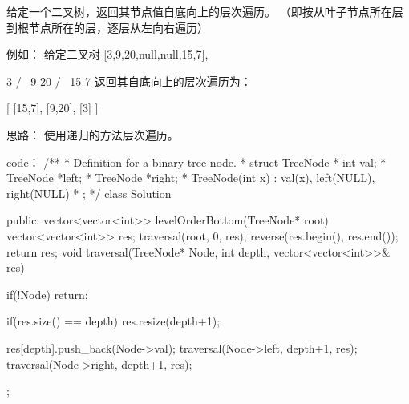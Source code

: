 给定一个二叉树，返回其节点值自底向上的层次遍历。 （即按从叶子节点所在层到根节点所在的层，逐层从左向右遍历）

例如：
给定二叉树 [3,9,20,null,null,15,7],

    3
   / \
  9  20
    /  \
   15   7
返回其自底向上的层次遍历为：

[
  [15,7],
  [9,20],
  [3]
]



























思路：
使用递归的方法层次遍历。



























code：
/**
 * Definition for a binary tree node.
 * struct TreeNode {
 *     int val;
 *     TreeNode *left;
 *     TreeNode *right;
 *     TreeNode(int x) : val(x), left(NULL), right(NULL) {}
 * };
 */
class Solution {
public:
    vector<vector<int>> levelOrderBottom(TreeNode* root) {
        vector<vector<int>> res;
        traversal(root, 0, res);
        reverse(res.begin(), res.end());
        return res;
    }
    void traversal(TreeNode* Node, int depth, vector<vector<int>>& res)
    {
        if(!Node) return;
        
        if(res.size() == depth)
            res.resize(depth+1);
        
        res[depth].push_back(Node->val);
        traversal(Node->left, depth+1, res);
        traversal(Node->right, depth+1, res);
    }
};